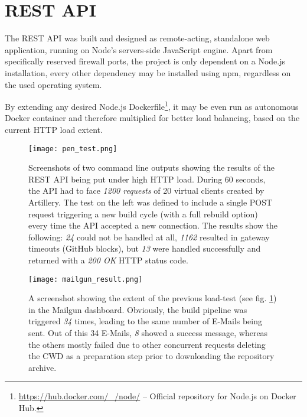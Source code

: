 \section{REST API}
\label{sec:restapi}
The REST API was built and designed as remote-acting, standalone web application, running on Node's servers-side JavaScript engine. Apart from specifically reserved firewall ports, the project is only dependent on a Node.js installation, every other dependency may be installed using npm, regardless on the used operating system.

By extending any desired Node.js Dockerfile\footnote{\url{https://hub.docker.com/\_/node/} -- Official repository for Node.js on Docker Hub.}, it may be even run as autonomous Docker container and therefore multiplied for better load balancing, based on the current HTTP load extent.


\begin{figure}[h] %
    \centering
    \texttt{[image: pen\_test.png]}
    \caption{Screenshots of two command line outputs showing the results of the REST API being put under high HTTP load. During 60 seconds, the API had to face \emph{1200 requests} of 20 virtual clients created by Artillery. The test on the left was defined to include a single POST request triggering a new build cycle (with a full rebuild option) every time the API accepted a new connection. The results show the following: \emph{24} could not be handled at all, \emph{1162} resulted in gateway timeouts (GitHub blocks), but \emph{13} were handled successfully and returned with a \emph{200 OK} HTTP status code.}
    \label{fig:pen-test}
\end{figure}
%

\begin{figure}[h] %
    \centering
    \texttt{[image: mailgun\_result.png]}
    \caption{A screenshot showing the extent of the previous load-test (see fig. \ref{fig:pen-test}) in the Mailgun dashboard. Obviously, the build pipeline was triggered \emph{34} times, leading to the same number of E-Mails being sent. Out of this 34 E-Mails, \emph{8} showed a success message, whereas the others mostly failed due to other concurrent requests deleting the CWD as a preparation step prior to downloading the repository archive.}
    \label{fig:mailgun-result}
\end{figure}
%

